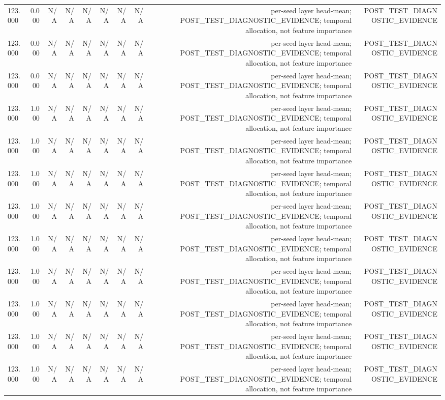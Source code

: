 \begin{table}[h!]
\begin{tabular}{lrrrrrrrrr}
123.000 & 0.000 & N/A & N/A & N/A & N/A & N/A & N/A & per-seed layer head-mean; POST\_TEST\_DIAGNOSTIC\_EVIDENCE; temporal allocation, not feature importance & POST\_TEST\_DIAGNOSTIC\_EVIDENCE \\
123.000 & 0.000 & N/A & N/A & N/A & N/A & N/A & N/A & per-seed layer head-mean; POST\_TEST\_DIAGNOSTIC\_EVIDENCE; temporal allocation, not feature importance & POST\_TEST\_DIAGNOSTIC\_EVIDENCE \\
123.000 & 0.000 & N/A & N/A & N/A & N/A & N/A & N/A & per-seed layer head-mean; POST\_TEST\_DIAGNOSTIC\_EVIDENCE; temporal allocation, not feature importance & POST\_TEST\_DIAGNOSTIC\_EVIDENCE \\
123.000 & 1.000 & N/A & N/A & N/A & N/A & N/A & N/A & per-seed layer head-mean; POST\_TEST\_DIAGNOSTIC\_EVIDENCE; temporal allocation, not feature importance & POST\_TEST\_DIAGNOSTIC\_EVIDENCE \\
123.000 & 1.000 & N/A & N/A & N/A & N/A & N/A & N/A & per-seed layer head-mean; POST\_TEST\_DIAGNOSTIC\_EVIDENCE; temporal allocation, not feature importance & POST\_TEST\_DIAGNOSTIC\_EVIDENCE \\
123.000 & 1.000 & N/A & N/A & N/A & N/A & N/A & N/A & per-seed layer head-mean; POST\_TEST\_DIAGNOSTIC\_EVIDENCE; temporal allocation, not feature importance & POST\_TEST\_DIAGNOSTIC\_EVIDENCE \\
123.000 & 1.000 & N/A & N/A & N/A & N/A & N/A & N/A & per-seed layer head-mean; POST\_TEST\_DIAGNOSTIC\_EVIDENCE; temporal allocation, not feature importance & POST\_TEST\_DIAGNOSTIC\_EVIDENCE \\
123.000 & 1.000 & N/A & N/A & N/A & N/A & N/A & N/A & per-seed layer head-mean; POST\_TEST\_DIAGNOSTIC\_EVIDENCE; temporal allocation, not feature importance & POST\_TEST\_DIAGNOSTIC\_EVIDENCE \\
123.000 & 1.000 & N/A & N/A & N/A & N/A & N/A & N/A & per-seed layer head-mean; POST\_TEST\_DIAGNOSTIC\_EVIDENCE; temporal allocation, not feature importance & POST\_TEST\_DIAGNOSTIC\_EVIDENCE \\
123.000 & 1.000 & N/A & N/A & N/A & N/A & N/A & N/A & per-seed layer head-mean; POST\_TEST\_DIAGNOSTIC\_EVIDENCE; temporal allocation, not feature importance & POST\_TEST\_DIAGNOSTIC\_EVIDENCE \\
123.000 & 1.000 & N/A & N/A & N/A & N/A & N/A & N/A & per-seed layer head-mean; POST\_TEST\_DIAGNOSTIC\_EVIDENCE; temporal allocation, not feature importance & POST\_TEST\_DIAGNOSTIC\_EVIDENCE \\
123.000 & 1.000 & N/A & N/A & N/A & N/A & N/A & N/A & per-seed layer head-mean; POST\_TEST\_DIAGNOSTIC\_EVIDENCE; temporal allocation, not feature importance & POST\_TEST\_DIAGNOSTIC\_EVIDENCE \\

\end{tabular}
\end{table}
